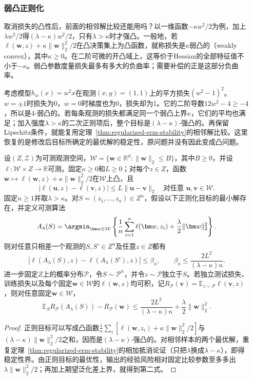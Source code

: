 \subsubsection{弱凸正则化}
\label{sec:weakly-convex-regularization}

取消损失的凸性后，前面的相邻解比较还能用吗？以一维函数$-\kappa w^2/2$为例，加上$\lambda w^2/2$得$(\lambda-\kappa)w^2/2$，只有$\lambda>\kappa$时才强凸。一般地，若$\ell(\bm w,z)+\kappa\|\bm w\|_2^2/2$在凸决策集上为凸函数，就称损失是$\kappa$弱凸的（weakly convex），其中$\kappa\geq0$。在二阶可微的开凸域上，这等价于Hessian的全部特征值不小于$-\kappa$。弱凸参数度量损失最多有多大的负曲率；需要补偿的正是这部分负曲率。
\label{def:weakly-convex}

考虑模型$h_w(x)=w^2x$在观测$(x,y)=(1,1)$上的平方损失$(w^2-1)^2$。$w=\pm1$时损失为0，$w=0$时梯度也为0，损失却为1。它的二阶导数$12w^2-4\geq-4$，所以是4-弱凸的。若每条观测的损失都满足同一个弱凸上界$\kappa$，它们的平均也满足；加入强度$\lambda>\kappa$的二次正则项后，整个目标是$(\lambda-\kappa)$-强凸的。再保留Lipschitz条件，就能复用定理~\ref{thm:regularized-erm-stability}的相邻解比较。这里恢复的是修改后目标所确定的最优解的稳定性，原问题并没有因此变成凸问题。

\begin{theorem}[弱凸损失的正则化稳定性]
\label{thm:weakly-convex-regularization}
设$(Z,\mathcal Z)$为可测观测空间，$\mathcal W=\{\bm w\in\mathbb R^d:\|\bm w\|_2\leq B\}$，其中$B\geq0$，并设$\ell:\mathcal W\times Z\to\mathbb R$可测。固定$\kappa\geq0$和$L\geq0$；对每个$z\in Z$，函数$\bm w\mapsto\ell(\bm w,z)+\kappa\|\bm w\|_2^2/2$在$\mathcal W$上凸，且
\[
 |\ell(\bm u,z)-\ell(\bm v,z)|\leq L\|\bm u-\bm v\|_2
 \quad\text{对任意 }\bm u,\bm v\in\mathcal W.
\]
固定$n\geq1$并取$\lambda>\kappa$。对$S=(z_1,\ldots,z_n)\in Z^n$，假设以下正则化目标的最小解存在，并定义可测算法
\[
 A_\lambda(S)=\argmin_{\bm w\in\mathcal W}
 \left\{\frac1n\sum_{i=1}^n\ell(\bm w,z_i)
 +\frac\lambda2\|\bm w\|_2^2\right\}.
\]
则对任意只相差一个观测的$S,S'\in Z^n$及任意$z\in Z$都有
\[
 |\ell(A_\lambda(S),z)-\ell(A_\lambda(S'),z)|
 \leq\beta_n,\qquad
 \beta_n\leq\frac{2L^2}{(\lambda-\kappa)n}.
\]
进一步固定$Z$上的概率分布$\mathcal P$，令$S\sim\mathcal P^n$，并令$z\sim\mathcal P$独立于$S$。若独立测试损失、训练损失以及每个固定$\bm w\in\mathcal W$的$\ell(\bm w,z)$均可积，记$R_{\mathcal P}(\bm v)=\mathbb E_{z\sim\mathcal P}\ell(\bm v,z)$，则对任意固定$\bm w\in\mathcal W$，
\[
 \mathbb E_S R_{\mathcal P}(A_\lambda(S))-R_{\mathcal P}(\bm w)
 \leq\frac{2L^2}{(\lambda-\kappa)n}+\frac\lambda2\|\bm w\|_2^2.
\]
\end{theorem}
\begin{proof}
正则目标可以写成凸函数$\frac1n\sum_i[\ell(\bm w,z_i)+\kappa\|\bm w\|_2^2/2]$与$(\lambda-\kappa)\|\bm w\|_2^2/2$之和，因而是$(\lambda-\kappa)$-强凸的。对相邻样本的两个最优解，重复定理~\ref{thm:regularized-erm-stability}的相加抵消论证（只把$\lambda$换成$\lambda-\kappa$），即得稳定性界。由正则目标的最优性，输出的经验风险相对固定比较参数至多多出$\lambda\|\bm w\|_2^2/2$；再加上期望泛化差上界，就得到第二式。
\end{proof}


